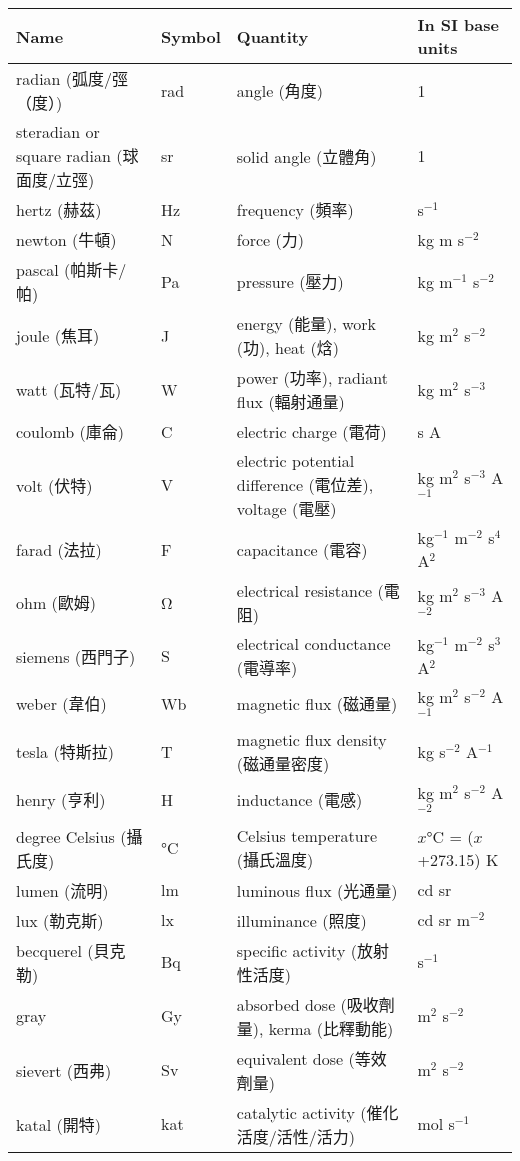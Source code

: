 \documentclass[a4paper,12pt]{article}
\begin{document}
\begin{longtable}[c]{|p{0.3\tw}|p{0.15\tw}|p{0.2\tw}|p{0.15\tw}|}
\hline
Name & Symbol & Quantity & In SI base units \\\hline\endhead
radian (弧度/弳（度）) & rad & angle (角度) & 1 \\\hline
steradian or square radian (球面度/立弳) & sr & solid angle (立體角) & 1 \\\hline
hertz (赫茲) & Hz & frequency (頻率) & s$^{-1}$ \\\hline
newton (牛頓) & N & force (力) & kg m s$^{-2}$ \\\hline
pascal (帕斯卡/帕) & Pa & pressure (壓力) & kg m$^{-1}$ s$^{-2}$ \\\hline
joule (焦耳) & J & energy (能量), work (功), heat (焓) & kg m$^2$ s$^{-2}$ \\\hline
watt (瓦特/瓦) & W & power (功率), radiant flux (輻射通量) & kg m$^2$ s$^{-3}$ \\\hline
coulomb (庫侖) & C & electric charge (電荷) & s A \\\hline
volt (伏特) & V & electric potential difference (電位差), voltage (電壓) & kg m$^2$ s$^{-3}$ A$^{-1}$ \\\hline
farad (法拉) & F & capacitance (電容) & kg$^{-1}$ m$^{-2}$ s$^4$ A$^2$ \\\hline
ohm (歐姆) & Ω & electrical resistance (電阻) & kg m$^2$ s$^{-3}$ A$^{-2}$ \\\hline
siemens (西門子) & S & electrical conductance (電導率) & kg$^{-1}$ m$^{-2}$ s$^3$ A$^2$ \\\hline
weber (韋伯) & Wb & magnetic flux (磁通量) & kg m$^2$ s$^{-2}$ A$^{-1}$ \\\hline
tesla (特斯拉) & T & magnetic flux density (磁通量密度) & kg s$^{-2}$ A$^{-1}$ \\\hline
henry (亨利) & H & inductance (電感) & kg m$^2$ s$^{-2}$ A$^{-2}$ \\\hline
degree Celsius (攝氏度) & °C & Celsius temperature (攝氏溫度) & $x$°C = ($x$+273.15) K \\\hline
lumen (流明) & lm & luminous flux (光通量) & cd sr \\\hline
lux (勒克斯) & lx & illuminance (照度) & cd sr m$^{-2}$ \\\hline
becquerel (貝克勒) & Bq & specific activity (放射性活度) & s$^{-1}$ \\\hline
gray & Gy & absorbed dose (吸收劑量), kerma (比釋動能) & m$^2$ s$^{-2}$ \\\hline
sievert (西弗) & Sv & equivalent dose (等效劑量) & m$^2$ s$^{-2}$ \\\hline
katal (開特) & kat & catalytic activity (催化活度/活性/活力) & mol s$^{-1}$ \\\hline
\end{longtable}\FB
\end{document}
